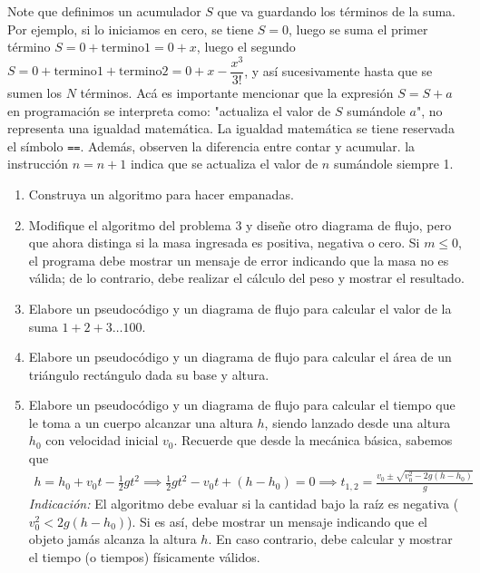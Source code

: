\documentclass[12pt]{article}
\begin{document}
Note que definimos un acumulador $S$ que va guardando los términos de la suma. 
Por ejemplo, si lo iniciamos en cero, se tiene $S=0$, luego se suma el primer 
término $S = 0 + \text{termino}1 = 0 + x$, luego el segundo
$S =  0 + \text{termino}1 + \text{termino}2 =  0 + x - \dfrac{x^3}{3!}$, 
y así sucesivamente hasta que se sumen los $N$ términos. Acá es importante mencionar que la
expresión $S =S +a$ en programación se interpreta como: "actualiza el valor de $S$ 
sumándole $a$", no representa una igualdad matemática. La igualdad matemática se
tiene reservada el símbolo \texttt{==}. Además, observen la diferencia entre 
contar y acumular. la instrucción $n = n + 1$ indica que se actualiza el valor de $n$ 
sumándole siempre 1.


\begin{problemas}[]
    \begin{enumerate}
        \item Construya un algoritmo para hacer empanadas.  
        \item Modifique el algoritmo del problema 3 y diseñe otro diagrama de flujo,
        pero que ahora distinga si la masa ingresada es positiva, negativa 
        o cero. Si $m \le 0$, el programa debe mostrar un mensaje de error 
        indicando que la masa no es válida; de lo contrario, debe realizar el 
        cálculo del peso y mostrar el resultado.
        \item Elabore un pseudocódigo y un diagrama de flujo para calcular 
        el valor de la suma $1 + 2 +3\dots 100$.
        \item Elabore un pseudocódigo y un diagrama de flujo para calcular el área de un 
        triángulo rectángulo dada su base y altura.
        \item Elabore un pseudocódigo y un diagrama de flujo para calcular el tiempo que le
        toma a un cuerpo alcanzar una altura $h$, siendo lanzado 
        desde una altura $h_0$ con velocidad inicial $v_0$. Recuerde que desde la 
        mecánica básica, sabemos que 
        \begin{align*}
            h = h_0 + v_0 t - \frac{1}{2}gt^2 \implies \frac{1}{2}gt^2 - v_0 t + (h - h_0) = 0 \implies t_{1,2} = \frac{v_0 \pm \sqrt{v_0^2 - 2g(h - h_0)}}{g}
        \end{align*}
        \textit{Indicación:} El algoritmo debe evaluar si la cantidad bajo 
        la raíz es negativa ($v_0^2 < 2g(h - h_0)$). Si es así, 
        debe mostrar un mensaje indicando que el objeto jamás alcanza 
        la altura $h$. En caso contrario, debe calcular y mostrar el tiempo 
        (o tiempos) físicamente válidos.


\end{enumerate}
\end{problemas}
\end{document}

